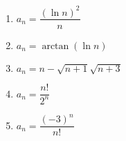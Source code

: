 \begin{multicols}{2}
\begin{enumerate}
        \item $a_n = \dfrac{(\ln n)^2}{n}$
        \item $a_n = \arctan(\ln n)$
        \item $a_n = n - \sqrt{n + 1} \sqrt{n + 3}$
        \item $a_n = \dfrac{n!}{2^n}$
        \item $a_n = \dfrac{(-3)^n}{n!}$
    \end{enumerate}
\end{multicols}